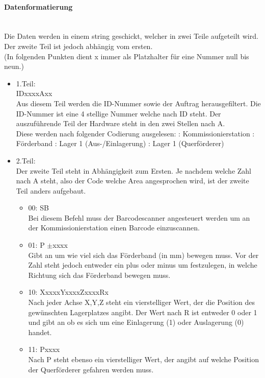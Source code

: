         \paragraph{Datenformatierung}\mbox{}\\
        Die Daten werden in einem string geschickt, welcher in zwei Teile aufgeteilt wird. Der zweite Teil ist jedoch abhängig vom ersten. \\
        (In folgenden Punkten dient x immer als Platzhalter für eine Nummer null bis neun.) 
        \begin{itemize}
            \item 1.Teil: \\
            IDxxxxAxx  \\
            Aus diesem Teil werden die ID-Nummer sowie der Auftrag herausgefiltert. Die ID-Nummer ist eine 4 stellige Nummer welche nach ID steht. Der auszuführende Teil der Hardware steht in den zwei Stellen nach A.\\
            Diese werden nach folgender Codierung ausgelesen:
                : Kommissionierstation
                : Förderband
                : Lager 1 (Aus-/Einlagerung)
                : Lager 1 (Querförderer)
            \item 2.Teil: \\
            Der zweite Teil steht in Abhängigkeit zum Ersten. Je nachdem welche Zahl nach A steht, also der Code welche Area angesprochen wird, ist der zweite Teil anders aufgebaut.
                \begin{itemize}
                \item 00: SB\\
                Bei diesem Befehl muss der Barcodescanner angesteuert werden um an der Kommissionierstation einen Barcode einzuscannen.
                \item 01: P $\pm$xxxx \\
                Gibt an um wie viel sich das Förderband (in mm) bewegen muss. Vor der Zahl steht jedoch entweder ein plus oder minus um festzulegen, in welche Richtung sich das Förderband bewegen muss. 
                \item 10: XxxxxYxxxxZxxxxRx \\
                Nach jeder Achse X,Y,Z steht ein vierstelliger Wert, der die Position des gewünschten Lagerplatzes angibt. Der Wert nach R ist entweder 0 oder 1 und gibt an ob es sich um eine Einlagerung (1) oder Auslagerung (0) handet.
                \item 11: Pxxxx \\
                Nach P steht ebenso ein vierstelliger Wert, der angibt auf welche Position der Querförderer gefahren werden muss. 
                
                \end{itemize}
            
        \end{itemize}

